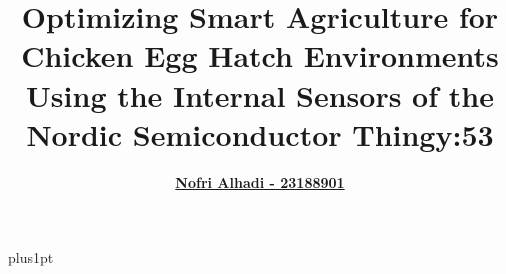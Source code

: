 \documentclass[openright,12pt]{Latex/Classes/PhDthesisPSnPDF}
\title{Optimizing Smart Agriculture for Chicken Egg Hatch Environments Using the Internal Sensors of the Nordic Semiconductor Thingy:53}
\author{\href{mailto:nofrialhadi@gmail.com}{\textbf{Nofri Alhadi - 23188901}}}
\begin{document}


\renewcommand\baselinestretch{1.2}
\baselineskip=18pt plus1pt



\maketitle  %

\end{document}
